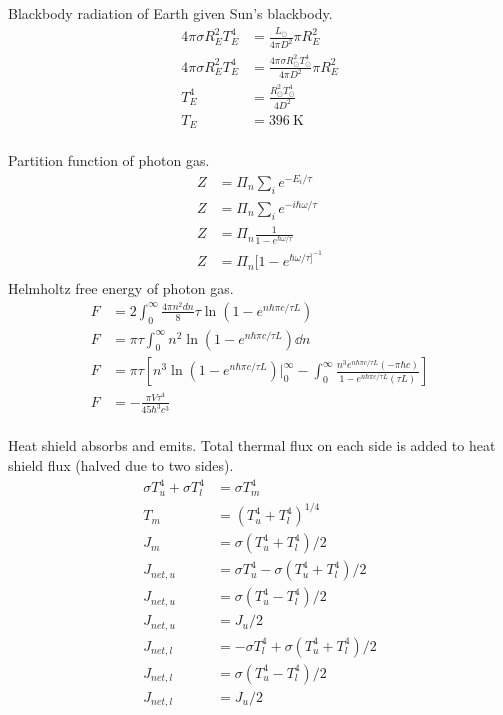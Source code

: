 \documentclass{homework}
\begin{document}
\maketitle


\question
Blackbody radiation of Earth given Sun's blackbody.
\begin{align*}
    4\pi\sigma R_E^2 T_E^4	&=  \frac{L_\odot}{4\pi D^2} \pi R_E^2 \\
    4\pi\sigma R_E^2 T_E^4	&=  \frac{4\pi\sigma R_\odot^2 T_\odot^4}{4\pi D^2} \pi R_E^2 \\
    T_E^4	&=  \frac{R_\odot^2 T_\odot^4}{4 D^2} \\
    T_E &=  \boxed{\SI{396}{\kelvin}}   \\
\end{align*}


\question
Partition function of photon gas.
\begin{align*}
    Z	&=	\Pi_n \sum_i e^{-E_i/\tau}	\\
    Z	&=	\Pi_n \sum_i e^{-i \hbar \omega / \tau}	\\
    Z	&=	\Pi_n \frac{1}{1 - e^{\hbar\omega/\tau}}	\\
    Z	&=	\boxed{\Pi_n [1 - e^{\hbar\omega/\tau]^{-1}}}	\\
\end{align*}
Helmholtz free energy of photon gas.
\begin{align*}
    F	&=  2 \int_0^\infty \frac{4\pi n^2 dn}{8} \tau \ln{(1 - e^{n\hbar\pi c /\tau L})}  \\
    F	&=  \pi\tau \int_0^\infty n^2  \ln{(1 - e^{n\hbar\pi c /\tau L})} \dd{n}   \\
    F    &=	\pi\tau \left[  n^3 \ln{(1 - e^{n\hbar\pi c /\tau L})}|_0^\infty -  \int_0^\infty \frac{n^3 e^{n\hbar\pi c /\tau L} (-\pi \hbar c)}{1 - e^{n\hbar\pi c /\tau L} (\tau L)}  \right]	\\
    F    &=	\boxed{-\frac{\pi V \tau^4}{45 \hbar^3 c^3}} \\
\end{align*}


\question
Heat shield absorbs and emits. Total thermal flux on each side is added to heat shield flux (halved due to two sides).
\begin{align*}
    \sigma T_u^4 + \sigma T_l^4	&=	\sigma T_m^4	\\
    T_m &=  (T_u^4 + T_l^4)^{1/4}   \\
    J_m &=  \sigma (T_u^4 + T_l^4) / 2  \\
    J_{net,u}   &=  \sigma T_u^4 - \sigma (T_u^4 + T_l^4) / 2   \\
    J_{net,u}   &=  \sigma (T_u^4 - T_l^4) / 2   \\
    J_{net,u}   &=  \boxed{J_u / 2} \\
    J_{net,l}   &=  -\sigma T_l^4 + \sigma (T_u^4 + T_l^4) / 2   \\
    J_{net,l}   &=  \sigma (T_u^4 - T_l^4) / 2   \\
    J_{net,l}   &=  \boxed{J_u / 2} \\
\end{align*}
\end{document}
